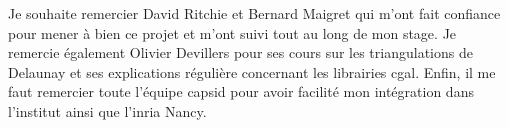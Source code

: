 Je souhaite remercier David Ritchie et Bernard Maigret qui m'ont fait confiance
pour mener à bien ce projet et m'ont suivi tout au long de mon stage. Je
remercie également Olivier Devillers pour ses cours sur les triangulations de Delaunay
et ses explications régulière concernant les librairies \gls{cgal}. Enfin, il me faut
remercier toute l'équipe \gls{capsid} pour avoir facilité mon intégration dans l'institut ainsi
que l'\gls{inria} Nancy.
